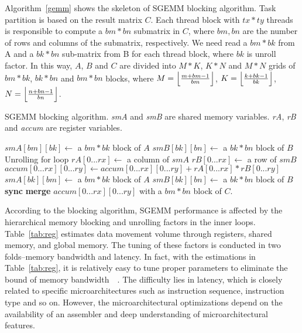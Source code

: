 Algorithm~\ref{gemm} shows the skeleton of SGEMM blocking algorithm. Task partition is based on the result matrix $C$. Each thread block with $tx*ty$ threads is responsible to compute a $bm*bn$ submatrix in $C$, where $bm, bn$ are the number of rows and columns of the submatrix, respectively. We need read a $bm*bk$ from A and a $bk*bn$ sub-matrix from B for each thread block, where $bk$ is unroll factor. In this way, $A$, $B$ and $C$ are divided into $M*K$, $K*N$ and $M*N$ grids of $bm*bk$, $bk*bn$ and $bm*bn$ blocks, where $M=\Bigl\lfloor \frac{m+bm-1}{bm} \Bigr\rfloor$, $K=\Bigl\lfloor \frac{k+bk-1}{bk} \Bigr\rfloor$, $N=\Bigl\lfloor \frac{n+bn-1}{bn} \Bigr\rfloor$.

\begin{algorithm}
  \caption{SGEMM blocking algorithm. {\em smA} and {\em smB} are shared memory variables. {\em rA}, {\em rB} and {\em accum} are register variables.}\label{gemm}
  \begin{algorithmic}[1]
	\State $smA[bm][bk] \gets$ a $bm * bk$ block of $A$
	\State $smB[bk][bn] \gets$ a $bk * bn$ block of $B$
	\Do
	 \Comment Unrolling for loop
	\State $rA[0...rx]\gets$ a column of $smA$
	\State $rB[0...rx]\gets$ a row of $smB$
	\State $accum[0...rx][0...ry]\gets accum[0...rx][0...ry]+rA[0...rx]*rB[0...ry]$
	\EndFor
	\State $smA[bk][bm]\gets$ a $bm*bk$ block of $A$
	\State $smB[bk][bn]\gets$ a $bk*bn$ block of $B$
	\State \textbf{sync}
	\State \textbf{merge} $accum[0...rx][0...ry]$ with a $bm*bn$ block of $C$.
  \end{algorithmic}
\end{algorithm}

According to the blocking algorithm, SGEMM performance is affected by the hierarchical memory blocking and unrolling factors in the inner loops. Table~\ref{tab:reg} estimates data movement volume through registers, shared memory, and global memory. The tuning of these factors is conducted in two folds--memory bandwidth and latency. In fact, with the estimations in Table~\ref{tab:reg}, it is relatively easy to tune proper parameters to eliminate the bound of memory bandwidth~\cite{magma}~\cite{tan}. The difficulty lies in latency, which is closely related to specific microarchitectures such as instruction sequence, instruction type and so on. However, the microarchitectural optimizations depend on the availability of an assembler and deep understanding of microarchitectural features. %

